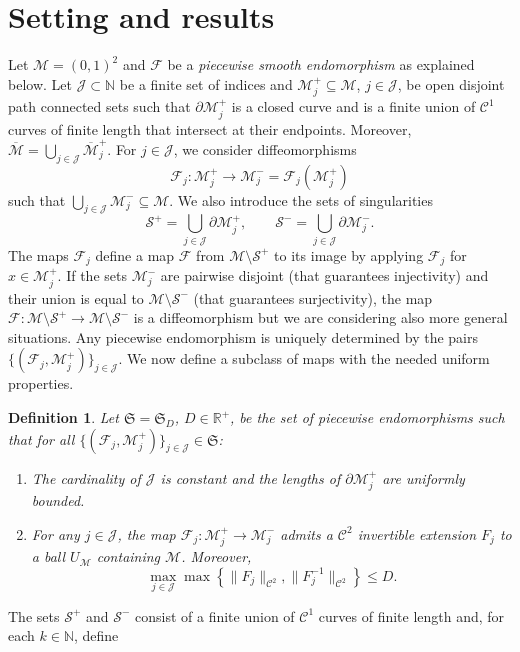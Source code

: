 \documentclass{amsart}
\numberwithin{equation}{section}
\newtheorem{definition}[theorem]{Definition}
\renewcommand{\le}{\leqslant}
\newcommand\cC{{\mathcal C}}
\newcommand\cF{{\mathcal F}}
\newcommand\cJ{{\mathcal J}}
\newcommand\cM{{\mathcal M}}
\newcommand\cS{{\mathcal S}}
\newcommand\bN{{\mathbb N}}
\newcommand\bR{{\mathbb R}}
\begin{document}
\section{Setting and results}
\label{sec:setting}
Let \(\cM = (0,1)^2\) and \(\cF\) be a \textit{piecewise smooth endomorphism} as explained below.
Let \(\cJ \subset \bN\) be a finite set of indices and \(\cM_j^+ \subseteq \cM\), \(j \in \cJ\), be open disjoint path connected sets such that \(\partial \cM_{j}^+\) is a closed curve and is a finite union of \(\cC^1\) curves of finite length that intersect at their endpoints. Moreover, \(\overline \cM = \bigcup_{j \in \cJ}\overline \cM_j^{+}\). For \(j \in \cJ\), we consider diffeomorphisms 
\[
\cF_j: \cM_j^{+} \to \cM_j^- = \cF_j(\cM^+_j)
\]
such that \(\bigcup_{j \in \cJ} \cM_j^{-} \subseteq \cM\). We also introduce the sets of singularities 
\[
\cS^{+} = \bigcup_{j \in \cJ}\partial \cM_j^{+}, \quad  \quad \cS^{-} =  \bigcup_{ j\in \cJ} \partial \cM_j^{-}.
\]
The maps \(\cF_j\) define a map \(\cF\) from \(\cM \setminus \cS^+\) to its image by applying \(\cF_j\) for \(x \in \cM_j^+\). If the sets \(\cM_j^{-}\) are pairwise disjoint (that guarantees injectivity) and their union is equal to \(\cM \setminus \cS^{-}\) (that guarantees surjectivity), the map \(\cF : \cM \setminus \cS^+ \to \cM \setminus \cS^-\) is a diffeomorphism but we are considering also more general situations. Any piecewise endomorphism is uniquely determined by the pairs \(\{(\cF_j, \cM_j^+)\}_{j \in \cJ}\). We now define a subclass of maps with the needed uniform properties.
\begin{definition}\label{def:uniform}
Let \(\mathfrak S = \mathfrak S_{ D}\), \(D \in \bR^+\), be the set of piecewise endomorphisms such that for all \(\{(\cF_j, \cM_j^+)\}_{j \in \cJ} \in \mathfrak S\):
\begin{enumerate}
\item  [{\crtcrossreflabel{(U1)}[ass:unif-extension0]}] The cardinality of \(\cJ\) is constant and the lengths of \(\partial \cM^+_{j}\) are uniformly bounded.
\item [{\crtcrossreflabel{(U2)}[ass:unif-extension]}] For any \(j \in \cJ\), the map \(\cF_j: \cM_{j}^{+} \to \cM_{j}^{-}\) admits a \(\cC^2\) invertible extension \(F_j\) to a ball \(U_{\cM}\) containing \(\cM\). Moreover, 
\[
\max_{j \in \cJ}\max\left\{\|F_j\|_{\cC^2}, \|F_j^{-1}\|_{\cC^2 } \right\} \le D.
\]
\end{enumerate}
\end{definition}
The sets \(\cS^{+}\) and \(\cS^{-}\) consist of a finite union of \(\cC^1\) curves of finite length and, for each \(k \in \bN\), define
\end{document}
